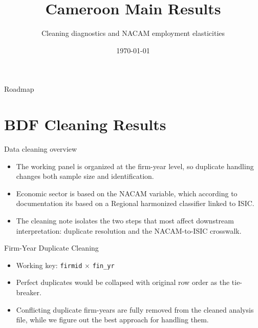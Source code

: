 \documentclass[aspectratio=169]{beamer}
\title{Cameroon Main Results}
\subtitle{Cleaning diagnostics and NACAM employment elasticities}
\author{}
\date{\today}
\begin{document}
\begin{frame}[plain]
    \titlepage
\end{frame}

\begin{frame}{Roadmap}
    \tableofcontents
\end{frame}

\section{BDF Cleaning Results}

\begin{frame}{Data cleaning overview}
    \begin{itemize}
        \item The working panel is organized at the firm-year level, so duplicate handling changes both sample size and identification.
        \item Economic sector is based on the NACAM variable, which according to documentation its based on a Regional harmonized classifier linked to ISIC.
        \item The cleaning note isolates the two steps that most affect downstream interpretation: duplicate resolution and the NACAM-to-ISIC crosswalk.
    \end{itemize}
\end{frame}

\begin{frame}{Firm-Year Duplicate Cleaning}
    \footnotesize
    \begin{itemize}
        \item Working key: \texttt{firmid} $\times$ \texttt{fin\_yr}
        \item Perfect duplicates would be collapsed with original row order as the tie-breaker.
        \item Conflicting duplicate firm-years are fully removed from the cleaned analysis file, while we figure out the best approach for handling them.
    \end{itemize}

    \vspace{0.2cm}
    \centering
\end{frame}
\end{document}

